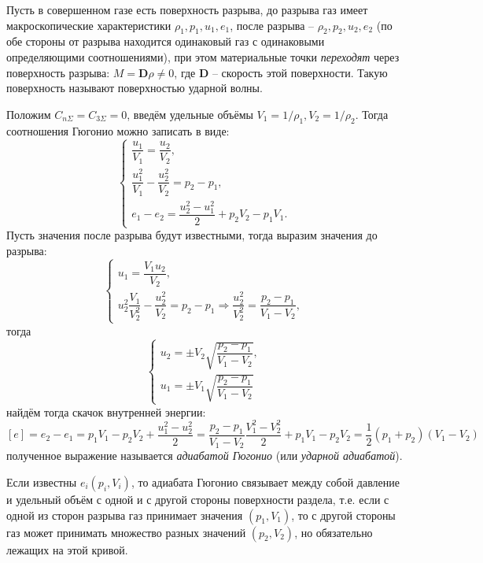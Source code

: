
Пусть в совершенном газе есть поверхность разрыва, до разрыва газ
имеет макроскопические характеристики $\rho_1, p_1, u_1, e_1$, после разрыва -- $\rho_2, p_2, u_2, e_2$
(по обе стороны от разрыва находится одинаковый газ с одинаковыми определяющими соотношениями),
при этом материальные точки \textit{переходят} через поверхность разрыва: $M = \mathbf{D} \rho \neq 0$, где $\mathbf{D}$ -- скорость этой поверхности. 
Такую поверхность называют поверхностью ударной волны.

Положим $C_{n\Sigma} = C_{3\Sigma} = 0$, введём удельные объёмы
$V_1 = 1 / \rho_1, V_2 = 1 / \rho_2$. Тогда соотношения Гюгонио можно записать в виде:
\[
  \begin{cases}
    \dfrac{u_1}{V_1} = \dfrac{u_2}{V_2}, \\
    \dfrac{u_1^2}{V_1} - \dfrac{u_2^2}{V_2} = p_2 - p_1, \\
    e_1 - e_2 = \dfrac{u_2^2 - u_1^2}{2} + p_2 V_2 - p_1 V_1.
  \end{cases}
\]
Пусть значения после разрыва будут известными, тогда выразим значения до разрыва:
\[
  \begin{cases}
    u_1 = \dfrac{V_1 u_2}{V_2}, \\
    u_2^2 \dfrac{V_1}{V_2^2} - \dfrac{u_2^2}{V_2} = p_2 - p_1 \Rightarrow \dfrac{u_2^2}{V_2^2} = \dfrac{p_2-p_1}{V_1 - V_2},
  \end{cases}
\]
тогда
\[
  \begin{cases}
    u_2 = \pm V_2 \sqrt{\dfrac{p_2-p_1}{V_1 - V_2}}, \\
    u_1 = \pm V_1 \sqrt{\dfrac{p_2 - p_1}{V_1 - V_2}}
  \end{cases}
\]
найдём тогда скачок внутренней энергии:
\[
  [e] = e_2 - e_1 = p_1 V_1 - p_2V_2 + \dfrac{u_1^2 - u_2^2}{2} =
  \dfrac{p_2-p_1}{V_1-V_2} \dfrac{V_1^2 - V_2^2}{2} + p_1V_1 - p_2V_2 =
  \dfrac{1}{2} (p_1+p_2) (V_1 - V_2)
\]
полученное выражение называется \emph{адиабатой Гюгонио} (или \emph{ударной адиабатой}).

Если известны $e_i (p_i, V_i)$, то адиабата Гюгонио связывает между собой давление и удельный
объём с одной и с другой стороны поверхности раздела, т.е. если с одной из сторон разрыва
газ принимает значения $(p_1, V_1)$, то с другой стороны газ может принимать множество разных
значений $(p_2, V_2)$, но обязательно лежащих на этой кривой.

